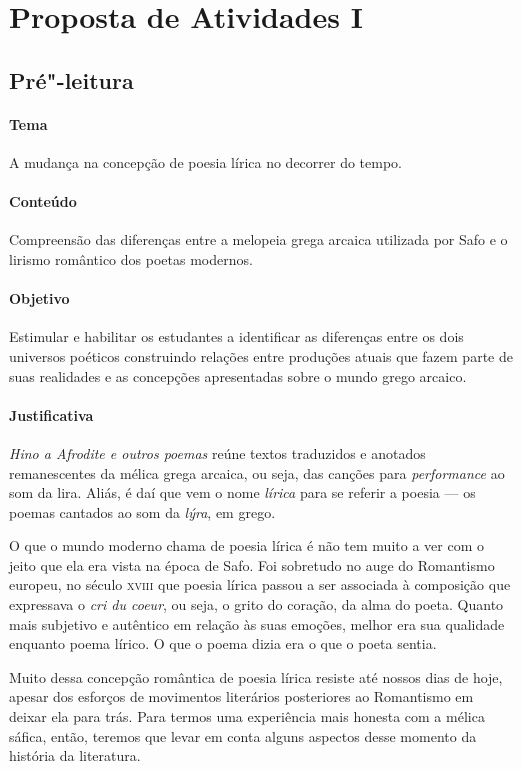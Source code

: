 \documentclass[12pt]{extarticle}
\begin{document}
\section{Proposta de Atividades I}

\subsection{Pré"-leitura}

\paragraph{Tema} A mudança na concepção de poesia lírica no decorrer do tempo.

\paragraph{Conteúdo} Compreensão das diferenças entre a melopeia grega arcaica
utilizada por Safo e o lirismo romântico dos poetas modernos.

\paragraph{Objetivo} Estimular e habilitar os estudantes a identificar as 
diferenças entre os dois universos poéticos construindo relações entre
produções atuais que fazem parte de suas realidades e as concepções 
apresentadas sobre o mundo grego arcaico.

\paragraph{Justificativa} \emph{Hino a Afrodite e outros poemas} reúne textos traduzidos 
e anotados remanescentes da mélica grega arcaica, ou seja, das canções para 
\textit{performance} ao som da lira. Aliás, é daí que vem o nome \emph{lírica} 
para se referir a poesia --- os poemas cantados ao som da \textit{lýra}, em grego.

O que o mundo moderno chama de poesia lírica é não tem muito a ver com
o jeito que ela era vista na época de Safo. Foi sobretudo no auge do
Romantismo europeu, no século \textsc{xviii} que poesia lírica passou a ser
associada à composição que expressava o \textit{cri du coeur}, ou seja,
o grito do coração, da alma do poeta. Quanto mais subjetivo e autêntico
em relação às suas emoções, melhor era sua qualidade enquanto poema
lírico. O que o poema dizia era o que o poeta sentia. 

Muito dessa concepção romântica de poesia lírica resiste até nossos dias
de hoje, apesar dos esforços de movimentos literários posteriores ao Romantismo
em deixar ela para trás. Para termos uma experiência mais honesta com a mélica 
sáfica, então, teremos que levar em conta alguns aspectos desse momento da 
história da literatura.
\end{document}

